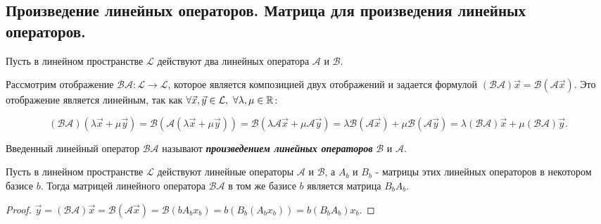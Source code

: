 \newpage


\subsection{
    Произведение линейных операторов. Матрица для произведения 
    линейных операторов.
}

Пусть в линейном пространстве $\mathcal{L}$ действуют два линейных оператора $\mathscr{A}$ и $\mathscr{B}$. 

Рассмотрим отображение $\mathscr{B}\mathscr{A} \colon \mathcal{L} \to \mathcal{L}$, которое является композицией двух отображений и задается формулой $(\mathscr{B}\mathscr{A})\vec{x} = \mathscr{B}(\mathscr{A}\vec{x})$. Это отображение является линейным, так как $\forall \vec{x}, \vec{y} \in \mathcal{L},\thinspace \thinspace \forall \lambda, \mu \in \mathbb{R}$:

$$(\mathscr{B}\mathscr{A})(\lambda\vec{x} + \mu\vec{y}) = \mathscr{B}(\mathscr{A}(\lambda\vec{x} + \mu\vec{y})) = \mathscr{B}(\lambda\mathscr{A}\vec{x} + \mu\mathscr{A}\vec{y}) = \lambda\mathscr{B}(\mathscr{A}\vec{x}) + \mu\mathscr{B}(\mathscr{A}\vec{y}) = \lambda(\mathscr{B}\mathscr{A})\vec{x} + \mu(\mathscr{B}\mathscr{A})\vec{y}.$$

Введенный линейный оператор $\mathscr{B}\mathscr{A}$ называют \textit{\textbf{произведением линейных операторов}} $\mathscr{B}$ и $\mathscr{A}$.

\begin{theorem}
    Пусть в линейном пространстве $\mathcal{L}$ действуют линейные операторы $\mathscr{A}$ и $\mathscr{B}$, а $A_b$ и $B_b$ - матрицы этих линейных операторов в некотором базисе $b$. Тогда матрицей линейного оператора $\mathscr{B}\mathscr{A}$ в том же базисе $b$ является матрица $B_bA_b$.
\end{theorem}

\begin{proof}
    $\vec{y} = (\mathscr{B}\mathscr{A})\vec{x} = \mathscr{B}(\mathscr{A}\vec{x}) = \mathscr{B}(bA_bx_b) = b(B_b(A_bx_b)) = b(B_bA_b)x_b.$
\end{proof}
